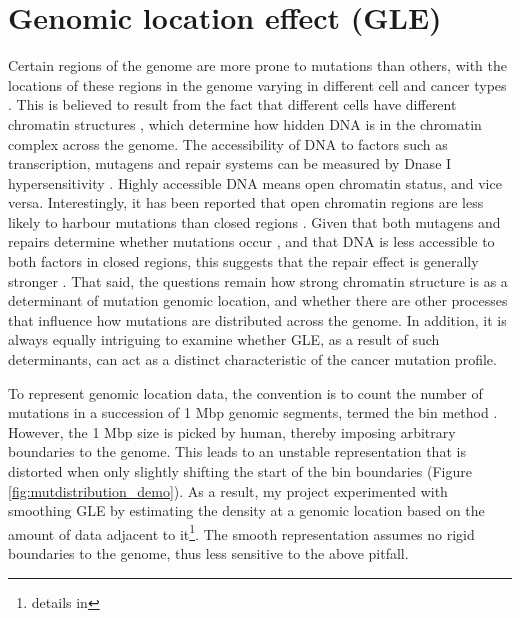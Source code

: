 \section{Genomic location effect (GLE)}
\label{intro:gle}
Certain regions of the genome are more prone to mutations than others, with the locations of these regions in the genome varying in different cell and cancer types \citep{Polak2015, Jiao2020}. This is believed to result from the fact that different cells have different chromatin structures \citep{Abascal2020ExpandedGenomes}, which determine how hidden DNA is in the chromatin complex across the genome. The accessibility of DNA to factors such as transcription, mutagens and repair systems can be measured by Dnase I hypersensitivity \citep[DHS;][]{Liu2019AApplications}. Highly accessible DNA means open chromatin status, and vice versa. Interestingly, it has been reported that open chromatin regions are less likely to harbour mutations than closed regions \citep{Polak2015,Prendergast2007ChromatinGenome}. Given that both \glspl{mutagen} and repairs determine whether mutations occur \citep{Ripley2001Mutation}, and that DNA is less accessible to both factors in closed regions, this suggests that the repair effect is generally stronger \citep[Figure \ref{fig:chromatin_demo};][]{Teng1997ExcisionSequences, Morse2002PhotoreactivationCerevisiae}. That said, the questions remain how strong chromatin structure is as a determinant of mutation genomic location, and whether there are other processes that influence how mutations are distributed across the genome. In addition, it is always equally intriguing to examine whether GLE, as a result of such determinants, can act as a distinct characteristic of the cancer mutation profile. 



To represent genomic location data, the convention is to count the number of mutations in a succession of 1 Mbp genomic segments, termed the bin method \citep{Kubler2019, Salvadores2019PassengerTumors, Chalmers2017AnalysisBurden, Salvadores2020MatchingPatterns}. However, the 1 Mbp size is picked by human, thereby imposing arbitrary boundaries to the genome. This leads to an unstable representation that is distorted when only slightly shifting the start of the bin boundaries (Figure \ref{fig:mutdistribution_demo}). As a result, my project experimented with smoothing GLE by estimating the \gls{density} at a genomic location based on the amount of data adjacent to it\footnote{details in }. The smooth representation assumes no rigid boundaries to the genome, thus less sensitive to the above pitfall. 


